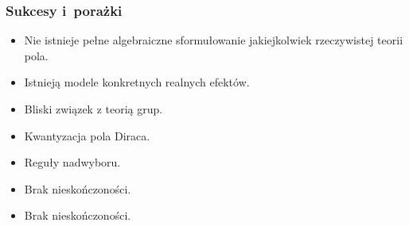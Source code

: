 \documentclass[10pt,t]{beamer}
\begin{document}
\begin{frame}
  \frametitle{Sukcesy i~porażki}


  \begin{itemize}
    \RaggedRight

  \item Nie istnieje pełne algebraiczne sformułowanie jakiejkolwiek
    rzeczywistej teorii pola.

  \item Istnieją modele konkretnych realnych efektów.

  \item Bliski związek z teorią grup.

  \item Kwantyzacja pola Diraca.

  \item Reguły nadwyboru.

  \item Brak nieskończoności.

  \item Brak nieskończoności.

  \end{itemize}

\end{frame}










\appendix

















{}






\end{document}
